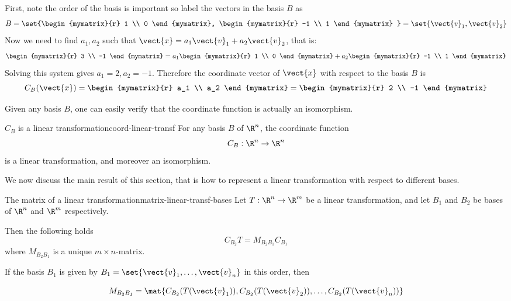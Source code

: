 \begin{solution}
First, note the order of the basis is important so label the vectors in the basis $B$ as
\[
B = \set{\begin{mymatrix}{r}
1 \\
0
\end{mymatrix}, \begin{mymatrix}{r}
-1 \\
1
\end{mymatrix} } = \set{\vect{v}_1, \vect{v}_2 } \]
Now we need to find $a_1, a_2$ such that $\vect{x} = a_1 \vect{v}_1 + a_2 \vect{v}_2$, that is:
\[
\begin{mymatrix}{r}
3 \\
-1
\end{mymatrix}
=
a_1
\begin{mymatrix}{r}
1 \\
0
\end{mymatrix}
+ a_2
\begin{mymatrix}{r}
-1 \\
1
\end{mymatrix}\]
Solving this system gives $a_1 = 2, a_2 = -1$. Therefore the coordinate vector of $\vect{x}$ with respect to the basis $B$ is
\[
C_B(\vect{x})
=
\begin{mymatrix}{r}
a_1 \\
a_2
\end{mymatrix}
= \begin{mymatrix}{r}
2 \\
-1
\end{mymatrix}
\]
\end{solution}

Given any basis $B$, one can easily verify that the coordinate function is actually an isomorphism.

\begin{theorem}{$C_B$ is a linear transformation}{coord-linear-transf}
For any basis $B$ of $\R^n$, the coordinate function
\[ C_B: \R^n  \rightarrow \R^n  \]
is a linear transformation, and moreover an isomorphism.
\end{theorem}

We now discuss the main  result  of this section, that is how
to represent a linear transformation with respect to different
bases.

\begin{theorem}{The matrix of a linear transformation}{matrix-linear-transf-bases}
Let $T: \R^n \to \R^m$ be a linear transformation,
and let $B_1$ and $B_2$ be bases of $\R^{n}$ and
$\R^{m}$ respectively.

Then the following holds
\begin{equation}
C_{B_2} T = M_{B_{2} B_{1}} C_{B_1}   \label{matrix-equation}
\end{equation}
where $M_{B_{2} B_{1}}$  is a unique $m \times n$-matrix.

If the basis $B_1$ is given by $B_1=\set{\vect{v}_1,\ldots, \vect{v}_n}$ in this order, then

\[  M_{B_{2} B_{1}} = \mat{C_{B_2}(T(\vect{v}_1)), C_{B_2}(T(\vect{v}_2)), \ldots, C_{B_2}(T(\vect{v}_n)) } \]
\end{theorem}

